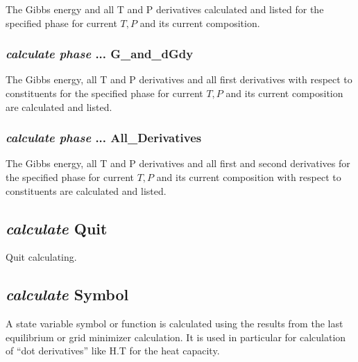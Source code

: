 \documentclass[12pt]{article}
\begin{document}
The Gibbs energy and all T and P derivatives calculated and listed for
the specified phase for current $T,P$ and its current composition.

\subsubsection{{\em calculate phase} ... G\_and\_dGdy}

The Gibbs energy, all T and P derivatives and all first derivatives
with respect to constituents for the specified phase for current $T,P$
and its current composition are calculated and listed.

\subsubsection{{\em calculate phase} ... All\_Derivatives}

The Gibbs energy, all T and P derivatives and all first and second
derivatives for the specified phase for current $T,P$ and its current
composition with respect to constituents are calculated and listed.

\subsection{{\em calculate} Quit}

Quit calculating.

\subsection{{\em calculate} Symbol}

A state variable symbol or function is calculated using the results
from the last equilibrium or grid minimizer calculation.  It is used
in particular for calculation of ``dot derivatives'' like H.T for the
heat capacity.
\end{document}
